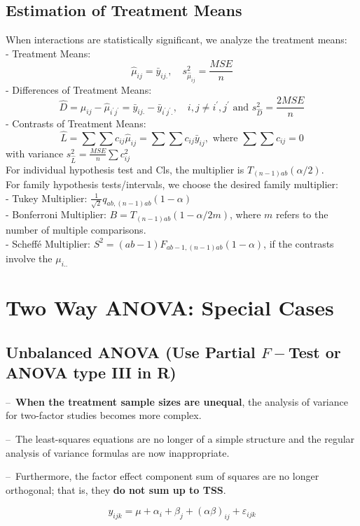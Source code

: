 \documentclass[11pt,a4paper]{article}
\begin{document}
\subsection{Estimation of Treatment Means}
When interactions are statistically significant, we analyze the treatment means:\\
- Treatment Means: $$\hat{\mu}_{i j}=\bar{y}_{i j.}, \quad s_{\hat{\mu}_{i j}}^{2}=\frac{M S E}{n}$$
- Differences of Treatment Means:
$$
\hat{D}=\hat{\mu}_{i j}-\hat{\mu}_{i^{\prime} j^{\prime}}=\bar{y}_{i j.}-\bar{y}_{i^{\prime} j^{\prime} .}, \quad i, j \neq i^{\prime}, j^{\prime} \text { and } s_{\hat{D}}^{2}=\frac{2 M S E}{n}
$$
- Contrasts of Treatment Means:
$$
\hat{L}=\sum \sum c_{i j} \hat{\mu}_{i j}=\sum \sum c_{i j} \bar{y}_{i j}, \text { where } \sum \sum c_{i j}=0
$$
with variance $s_{\hat{L}}^{2}=\frac{M S E}{n} \sum c_{i j}^{2}$\\
For individual hypothesis test and Cls, the multiplier is $T_{(n-1) a b}(\alpha / 2)$.\\
For family hypothesis tests/intervals, we choose the desired family multiplier:\\
- Tukey Multiplier: $\frac{1}{\sqrt{2}} q_{a b,(n-1) a b}(1-\alpha)$\\
- Bonferroni Multiplier: $B=T_{(n-1) a b}(1-\alpha / 2 m)$, where $m$ refers to the number of multiple comparisons.\\
- Scheffé Multiplier: $S^{2}=(a b-1) F_{a b-1,(n-1) a b}(1-\alpha)$, if the contrasts involve the $\mu_{i . .}$



\section{Two Way ANOVA: Special Cases}
\subsection{Unbalanced ANOVA (Use \textbf{Partial $F-$Test} or ANOVA type III in R)}
–\ \textbf{When the treatment sample sizes are unequal}, the analysis of variance for two-factor studies becomes more complex.

–\ The least-squares equations are no longer of a simple structure and the regular analysis of variance formulas are now inappropriate.

–\ Furthermore, the factor effect component sum of squares are no longer orthogonal; that is, they \textbf{do not sum up to TSS}.

$$y_{ijk}=\mu+\alpha_i+\beta_j+(\alpha\beta)_{ij}+\varepsilon_{ijk}$$
\end{document}
